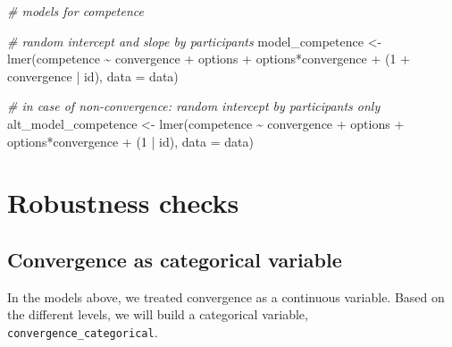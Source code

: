 \documentclass[
]{article}
\newenvironment{Shaded}{\begin{snugshade}}{\end{snugshade}}
\newcommand{\AttributeTok}[1]{\textcolor[rgb]{0.77,0.63,0.00}{#1}}
\newcommand{\CommentTok}[1]{\textcolor[rgb]{0.56,0.35,0.01}{\textit{#1}}}
\newcommand{\DecValTok}[1]{\textcolor[rgb]{0.00,0.00,0.81}{#1}}
\newcommand{\FunctionTok}[1]{\textcolor[rgb]{0.00,0.00,0.00}{#1}}
\newcommand{\NormalTok}[1]{#1}
\newcommand{\OtherTok}[1]{\textcolor[rgb]{0.56,0.35,0.01}{#1}}
\newcommand{\SpecialCharTok}[1]{\textcolor[rgb]{0.00,0.00,0.00}{#1}}
\begin{document}
\begin{Shaded}
\begin{Highlighting}[]
\CommentTok{\# models for competence}

\CommentTok{\# random intercept and slope by participants}
\NormalTok{model\_competence }\OtherTok{\textless{}{-}} \FunctionTok{lmer}\NormalTok{(competence }\SpecialCharTok{\textasciitilde{}}\NormalTok{ convergence }\SpecialCharTok{+}\NormalTok{ options }\SpecialCharTok{+} 
\NormalTok{                            options}\SpecialCharTok{*}\NormalTok{convergence }\SpecialCharTok{+}\NormalTok{ (}\DecValTok{1} \SpecialCharTok{+}\NormalTok{ convergence }\SpecialCharTok{|}\NormalTok{ id), }
                       \AttributeTok{data =}\NormalTok{ data)}

\CommentTok{\# in case of non{-}convergence: random intercept by participants only}
\NormalTok{alt\_model\_competence }\OtherTok{\textless{}{-}} \FunctionTok{lmer}\NormalTok{(competence }\SpecialCharTok{\textasciitilde{}}\NormalTok{ convergence }\SpecialCharTok{+}\NormalTok{ options }\SpecialCharTok{+} 
\NormalTok{                            options}\SpecialCharTok{*}\NormalTok{convergence }\SpecialCharTok{+}\NormalTok{ (}\DecValTok{1} \SpecialCharTok{|}\NormalTok{ id), }
                           \AttributeTok{data =}\NormalTok{ data)}
\end{Highlighting}
\end{Shaded}

\hypertarget{robustness-checks}{%
\section{Robustness checks}\label{robustness-checks}}

\hypertarget{convergence-as-categorical-variable}{%
\subsection{Convergence as categorical
variable}\label{convergence-as-categorical-variable}}

In the models above, we treated convergence as a continuous variable.
Based on the different levels, we will build a categorical variable,
\texttt{convergence\_categorical}.
\end{document}

